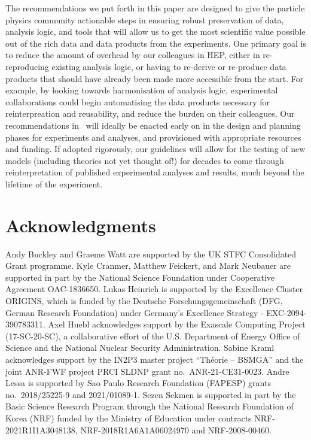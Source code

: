\documentclass[11pt]{article}
\begin{document}
The recommendations we put forth in this paper are designed to give the particle physics community actionable steps in ensuring robust preservation of data, analysis logic, and tools that will allow us to get the most scientific value possible out of the rich data and data products from the experiments.
One primary goal is to reduce the amount of overhead by our colleagues in \gls{HEP}, either in re-reproducing existing analysis logic, or having to re-derive or re-produce data products that should have already been made more accessible from the start.
For example, by looking towards harmonisation of analysis logic, experimental collaborations could begin automatising the data products necessary for reinterpreation and reusability, and reduce the burden on their colleagues.
Our recommendations in~ will %
ideally be enacted early on in 
the design and planning phases for experiments and analyses, and provisioned with appropriate resources and funding. 
If adopted rigorously, our guidelines will allow for the testing of new models (including theories not yet thought of!) for decades to come through reinterpretation %
of published experimental analyses and results, much beyond the lifetime of the experiment.

\section*{Acknowledgments}

Andy Buckley and Graeme Watt are supported by the UK STFC Consolidated Grant programme.
Kyle Cranmer, Matthew Feickert, and Mark Neubauer are supported in part by the National Science Foundation under Cooperative Agreement OAC-1836650.
Lukas Heinrich is supported by the Excellence Cluster ORIGINS, which is funded by the Deutsche Forschungsgemeinschaft (DFG, German Research Foundation) under Germany’s Excellence Strategy - EXC-2094-390783311.
Axel Huebl acknowledges support by the Exascale Computing Project (17-SC-20-SC), a collaborative effort of the U.S. Department of Energy Office of Science and the National Nuclear Security Administration.
Sabine Kraml acknowledges support by the IN2P3 master project ``Th\'eorie -- BSMGA'' and the joint ANR-FWF project PRCI SLDNP grant no.~ANR-21-CE31-0023.
Andre Lessa is supported by Sao Paulo Research Foundation (FAPESP) grants no.~2018/25225-9 and 2021/01089-1.
Sezen Sekmen is supported in part by the Basic Science Research Program through the National Research Foundation of Korea (NRF) funded by the Ministry of Education under contracts NRF-2021R1I1A3048138, NRF-2018R1A6A1A06024970 and NRF-2008-00460.
\end{document}
